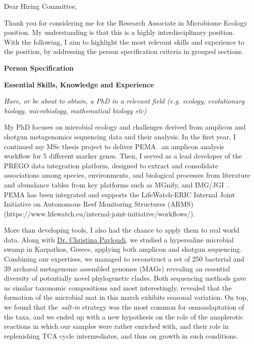 
Dear Hiring Committee, 

Thank you for considering me for the Research Associate in Microbiome Ecology position.
My understanding is that this is a highly interdisciplinary position. 
With the following, I aim to highlight the most relevant skills and experience 
to the position, by addressing the person specification criteria in grouped sections.

\textbf{Person Specification}

\textbf{Essential Skills, Knowledge and Experience}

\textit{
    Have, or be about to obtain, a PhD in a relevant field 
    (e.g. ecology, evolutionary biology, microbiology, mathematical biology etc)
}

    My PhD focuses on microbial ecology and challenges derived from 
    amplicon and shotgun metagenomics sequencing data and their analysis.
    In the first year, I continued my MSc thesis project to deliver PEMA~\cite{zafeiropoulos2020pema} 
    an amplicon analysis workflow for 5 different marker genes. 
    Then, I served as a lead developer of the PREGO data integration platform,
    designed to extract and consolidate associations among species, environments,
    and biological processes from literature and abundance tables from key platforms
    such as MGnify, and IMG/JGI~\cite{prego}.
    PEMA has been integrated and supports the LifeWatch-ERIC Internal Joint Initiative on
    Autonomous Reef Monitoring Structures (ARMS)
    (https://www.lifewatch.eu/internal-joint-initiative/workflows/).    

    More than developing tools, I also had the chance to apply them to real world data.
    Along with \href{https://cpavloud.github.io/mysite/about}{Dr. Christina Pavloudi}, 
    we studied a hypersaline microbial swamp in Karpathos, Greece,
    applying both amplicon and shotgun sequencing.
    Combining our expertises, we managed to reconstruct a set of 
    250 bacterial and 39 archaeal metagenome assembled genomes (MAGs)
    revealing an essential diversity of potentially novel phylogenetic clades.
    Both sequencing methods gave us similar taxonomic compositions and most interestingly,
    revealed that the formation of the microbial mat in this marsh 
    exhibits seasonal variation. 
    On top, we found that the~\textit{salt-in} strategy was the most common for osmoadaptation of the taxa,
    and we ended up with a new hypothesis on the role of the anaplerotic reactions 
    in which our samples were rather enriched with, 
    and their role in replenishing TCA cycle intermediates, and thus on growth in such conditions.
    
